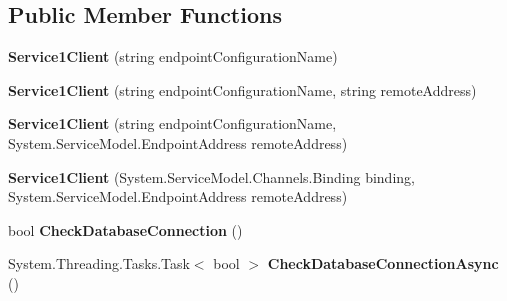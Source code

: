 \subsection*{Public Member Functions}
\begin{DoxyCompactItemize}
\item 
\hypertarget{class_unit_test_project_1_1_environmentalist_service_1_1_service1_client_a7ac497c0c374151b607a549133acc132}{}{\bfseries Service1\+Client} (string endpoint\+Configuration\+Name)\label{class_unit_test_project_1_1_environmentalist_service_1_1_service1_client_a7ac497c0c374151b607a549133acc132}

\item 
\hypertarget{class_unit_test_project_1_1_environmentalist_service_1_1_service1_client_ac58fbea691613de4c537146e8a873710}{}{\bfseries Service1\+Client} (string endpoint\+Configuration\+Name, string remote\+Address)\label{class_unit_test_project_1_1_environmentalist_service_1_1_service1_client_ac58fbea691613de4c537146e8a873710}

\item 
\hypertarget{class_unit_test_project_1_1_environmentalist_service_1_1_service1_client_ad0043eae6bcd8f96a3f58cd27485fcdb}{}{\bfseries Service1\+Client} (string endpoint\+Configuration\+Name, System.\+Service\+Model.\+Endpoint\+Address remote\+Address)\label{class_unit_test_project_1_1_environmentalist_service_1_1_service1_client_ad0043eae6bcd8f96a3f58cd27485fcdb}

\item 
\hypertarget{class_unit_test_project_1_1_environmentalist_service_1_1_service1_client_a97b8d6b8b7786104290a2b430532e141}{}{\bfseries Service1\+Client} (System.\+Service\+Model.\+Channels.\+Binding binding, System.\+Service\+Model.\+Endpoint\+Address remote\+Address)\label{class_unit_test_project_1_1_environmentalist_service_1_1_service1_client_a97b8d6b8b7786104290a2b430532e141}

\item 
\hypertarget{class_unit_test_project_1_1_environmentalist_service_1_1_service1_client_a2e6efc32dd869afd6cee502cfe33365a}{}bool {\bfseries Check\+Database\+Connection} ()\label{class_unit_test_project_1_1_environmentalist_service_1_1_service1_client_a2e6efc32dd869afd6cee502cfe33365a}

\item 
\hypertarget{class_unit_test_project_1_1_environmentalist_service_1_1_service1_client_a79a18d5c2df96413ef58f9917db38200}{}System.\+Threading.\+Tasks.\+Task$<$ bool $>$ {\bfseries Check\+Database\+Connection\+Async} ()\label{class_unit_test_project_1_1_environmentalist_service_1_1_service1_client_a79a18d5c2df96413ef58f9917db38200}


\end{DoxyCompactItemize}
